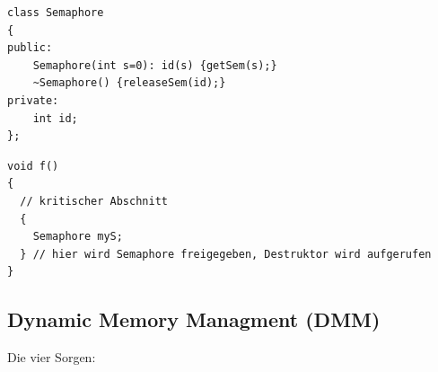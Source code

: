 \begin{lstlisting}
class Semaphore
{
public:
	Semaphore(int s=0): id(s) {getSem(s);}
	~Semaphore() {releaseSem(id);}
private:
	int id;
};
\end{lstlisting}
\begin{lstlisting}
void f()
{
  // kritischer Abschnitt
  {
    Semaphore myS;
  } // hier wird Semaphore freigegeben, Destruktor wird aufgerufen
}
\end{lstlisting}


















\subsection{Dynamic Memory Managment (DMM)}
Die vier Sorgen:\\
